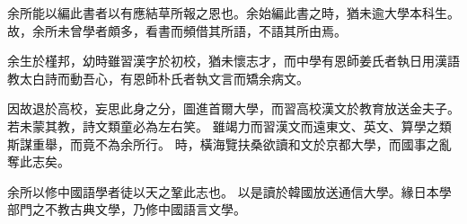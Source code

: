 余所能以編此書者以有應結草所報之恩也。余始編此書之時，猶未逾大學本科生。故，余所未曾學者頗多，看書而頻借其所語，不語其所由焉。

余生於槿邦，幼時雖習漢字於初校，猶未懷志才，而中學有恩師姜氏者執日用漢語教太白詩而動吾心，有恩師朴氏者執文言而矯余病文。

因故退於高校，妄思此身之分，圖進首爾大學，而習高校漢文於教育放送金夫子。若未蒙其教，詩文類童必為左右笑。
雖竭力而習漢文而遠東文、英文、算學之類斯謀重舉，而竟不為余所行。
時，橫海覽扶桑欲讀和文於京都大學，而國事之亂奪此志矣。

余所以修中國語學者徒以天之鞏此志也。
以是讀於韓國放送通信大學。緣日本學部門之不教古典文學，乃修中國語言文學。
